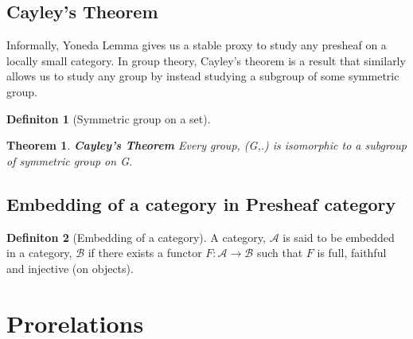 \documentclass[18pt,a4paper]{article}
\newtheorem{theorem}{Theorem}[section]
\theoremstyle{definition}
\newtheorem{definition}{Definiton}[section]
\begin{document}
\subsection{Cayley's Theorem}%
Informally, Yoneda Lemma gives us a stable proxy
to study any presheaf on a locally small category.
In group theory, Cayley's theorem is a result that similarly allows us to study any group by instead
studying a subgroup of some symmetric group.

\begin{definition}[Symmetric group on a set] %
\end{definition}
\begin{theorem}{\textbf{Cayley's Theorem}} %
	Every group, (G,.) is isomorphic to a subgroup of symmetric group on G.
\end{theorem}

\subsection{Embedding of a category in Presheaf category}%

\begin{definition}[Embedding of a category] %
	A category, $\mathcal{A}$  is said to be embedded in a category, $\mathcal{B}$ if there exists a
	functor $F: \mathcal{A} \to \mathcal{B} $ such that $F$ is full, faithful and injective (on objects).
\end{definition} %







\section{Prorelations}
\end{document}
